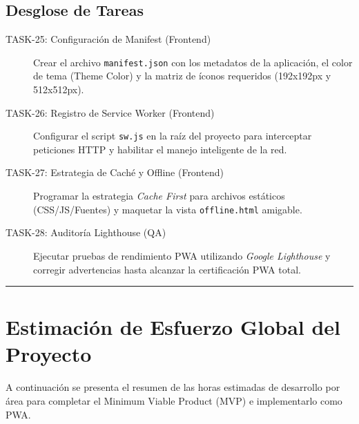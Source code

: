 \documentclass[11pt, letterpaper]{article}
\begin{document}
\begin{description}
    \subsection{Desglose de Tareas}
    \begin{description}
        \item[TASK-25: Configuración de Manifest (Frontend)] Crear el archivo \texttt{manifest.json} con los metadatos de la aplicación, el color de tema (Theme Color) y la matriz de íconos requeridos (192x192px y 512x512px).
        \item[TASK-26: Registro de Service Worker (Frontend)] Configurar el script \texttt{sw.js} en la raíz del proyecto para interceptar peticiones HTTP y habilitar el manejo inteligente de la red.
        \item[TASK-27: Estrategia de Caché y Offline (Frontend)] Programar la estrategia \textit{Cache First} para archivos estáticos (CSS/JS/Fuentes) y maquetar la vista \texttt{offline.html} amigable.
        \item[TASK-28: Auditoría Lighthouse (QA)] Ejecutar pruebas de rendimiento PWA utilizando \textit{Google Lighthouse} y corregir advertencias hasta alcanzar la certificación PWA total.
    \end{description}

    \vspace{1em}
    \hrule
    \vspace{2em}

    \section{Estimación de Esfuerzo Global del Proyecto}

    A continuación se presenta el resumen de las horas estimadas de desarrollo por área para completar el Minimum Viable Product (MVP) e implementarlo como PWA.


\end{description}
\end{document}

